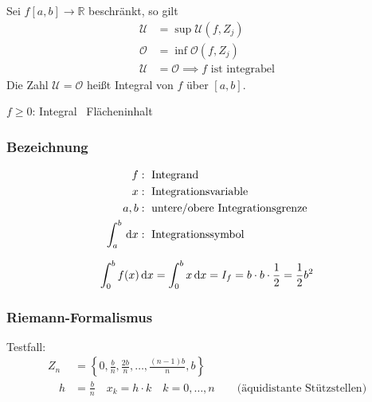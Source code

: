 \begin{definition}[Integrierbarkeit]
	Sei \( f[a,b] \rightarrow \mathbb{R} \) beschränkt, so gilt
	\begin{align*}
		\mathcal U &= \sup \mathcal U(f,Z_j)\\
		\mathcal O &= \inf \mathcal O(f,Z_j)\\
		\mathcal U &= \mathcal O \implies \text{$f$ ist integrabel}
	\end{align*}
	Die Zahl \( \mathcal U = \mathcal O \) heißt Integral von \( f \) über \( [a,b] \).
\end{definition}

\begin{note}
	\( f \geq 0 \): Integral \equals\ Flächeninhalt
\end{note}

\subsubsection*{Bezeichnung}
\begin{align*}
	f&: \text{ Integrand} \\
	x&: \text{ Integrationsvariable}\\
	a,b&: \text{ untere/obere Integrationsgrenze}\\	
	\int_a^b \,\mathrm d x &:\text{ Integrationssymbol}
\end{align*}

\begin{example}[\mbox{$f(x)=x$ in $[0,b]$}]
	\[
		\int_0^b f(x) \,\mathrm d x = \int_0^b x \,\mathrm d x = I_f = b \cdot b \cdot \frac{1}{2} = \frac{1}{2} b^2
	\]
\end{example}


\begin{center}
\end{center}


\subsubsection*{Riemann-Formalismus}
Testfall:
\begin{align*}
	Z_n &= \left\{0,\frac{b}{n},\frac{2b}{n},\ldots,\frac{(n-1)b}{n}, b\right\} \\
	\quad h &= \frac{b}{n} \quad x_k=h \cdot k \quad k=0,\ldots,n \qquad \text{(äquidistante Stützstellen)} 
\end{align*}

